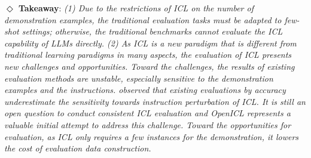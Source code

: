 \textbf{$\Diamond$ Takeaway}: \textit{(1) Due to the restrictions of ICL on the number of demonstration examples, the traditional evaluation tasks must be adapted to few-shot settings; otherwise, the traditional benchmarks cannot evaluate the ICL capability of LLMs directly.
(2) As ICL is a new paradigm that is different from traditional learning paradigms in many aspects, the evaluation of ICL presents new challenges and opportunities.
Toward the challenges, the results of existing evaluation methods are unstable, especially sensitive to the demonstration examples and the instructions. \citet{chen2022relation} observed that existing evaluations by accuracy underestimate the sensitivity towards instruction perturbation of ICL.
It is still an open question to conduct consistent ICL evaluation and OpenICL\cite{openicl} represents a valuable initial attempt to address this challenge.
Toward the opportunities for evaluation, as ICL only requires a few instances for the demonstration, it lowers the cost of evaluation data construction. 
}


